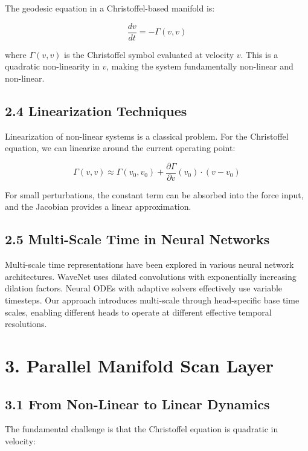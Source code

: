 \documentclass[12pt]{article}
\begin{document}
The geodesic equation in a Christoffel-based manifold is:

\begin{equation}
\frac{dv}{dt} = -\Gamma(v, v)
\end{equation}

where $\Gamma(v, v)$ is the Christoffel symbol evaluated at velocity $v$. This is a quadratic non-linearity in $v$, making the system fundamentally non-linear and non-linear.

\subsection{2.4 Linearization Techniques}

Linearization of non-linear systems is a classical problem. For the Christoffel equation, we can linearize around the current operating point:

\begin{equation}
\Gamma(v, v) \approx \Gamma(v_0, v_0) + \frac{\partial \Gamma}{\partial v}(v_0) \cdot (v - v_0)
\end{equation}

For small perturbations, the constant term can be absorbed into the force input, and the Jacobian provides a linear approximation.

\subsection{2.5 Multi-Scale Time in Neural Networks}

Multi-scale time representations have been explored in various neural network architectures. WaveNet uses dilated convolutions with exponentially increasing dilation factors. Neural ODEs with adaptive solvers effectively use variable timesteps. Our approach introduces multi-scale through head-specific base time scales, enabling different heads to operate at different effective temporal resolutions.

\section{3. Parallel Manifold Scan Layer}

\subsection{3.1 From Non-Linear to Linear Dynamics}

The fundamental challenge is that the Christoffel equation is quadratic in velocity:
\end{document}
